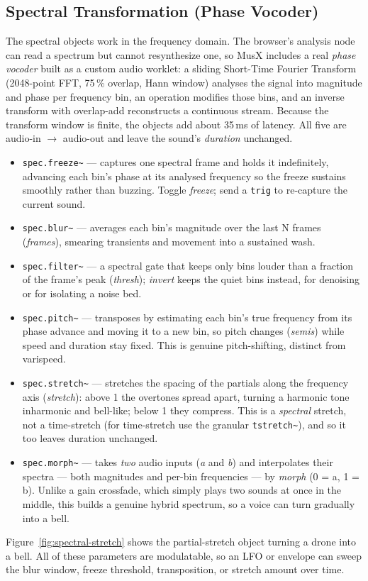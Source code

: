 \documentclass[11pt,letterpaper]{article}
\begin{document}
\subsection{Spectral Transformation (Phase Vocoder)}
\label{sec:spectral}
The spectral objects work in the frequency domain. The browser's analysis node can read
a spectrum but cannot resynthesize one, so MusX includes a real \emph{phase vocoder} built
as a custom audio worklet: a sliding Short-Time Fourier Transform (2048-point FFT, 75\,\%
overlap, Hann window) analyses the signal into magnitude and phase per frequency bin, an
operation modifies those bins, and an inverse transform with overlap-add reconstructs a
continuous stream. Because the transform window is finite, the objects add about 35\,ms of
latency. All five are audio-in $\to$ audio-out and leave the sound's \emph{duration}
unchanged.
\begin{itemize}
\item \texttt{spec.freeze\~{}} --- captures one spectral frame and holds it indefinitely,
advancing each bin's phase at its analysed frequency so the freeze sustains smoothly rather
than buzzing. Toggle \emph{freeze}; send a \texttt{trig} to re-capture the current sound.
\item \texttt{spec.blur\~{}} --- averages each bin's magnitude over the last N frames
(\emph{frames}), smearing transients and movement into a sustained wash.
\item \texttt{spec.filter\~{}} --- a spectral gate that keeps only bins louder than a
fraction of the frame's peak (\emph{thresh}); \emph{invert} keeps the quiet bins instead,
for denoising or for isolating a noise bed.
\item \texttt{spec.pitch\~{}} --- transposes by estimating each bin's true frequency from
its phase advance and moving it to a new bin, so pitch changes (\emph{semis}) while speed
and duration stay fixed. This is genuine pitch-shifting, distinct from varispeed.
\item \texttt{spec.stretch\~{}} --- stretches the spacing of the partials along the
frequency axis (\emph{stretch}): above 1 the overtones spread apart, turning a harmonic
tone inharmonic and bell-like; below 1 they compress. This is a \emph{spectral} stretch,
not a time-stretch (for time-stretch use the granular \texttt{tstretch\~{}}), and so it too
leaves duration unchanged.
\item \texttt{spec.morph\~{}} --- takes \emph{two} audio inputs (\emph{a} and \emph{b}) and
interpolates their spectra --- both magnitudes and per-bin frequencies --- by \emph{morph}
(0 = a, 1 = b). Unlike a gain crossfade, which simply plays two sounds at once in the
middle, this builds a genuine hybrid spectrum, so a voice can turn gradually into a bell.
\end{itemize}
Figure~\ref{fig:spectral-stretch} shows the partial-stretch object turning a drone into a
bell. All of these parameters are modulatable, so an LFO or envelope can sweep the blur
window, freeze threshold, transposition, or stretch amount over time.
\end{document}

